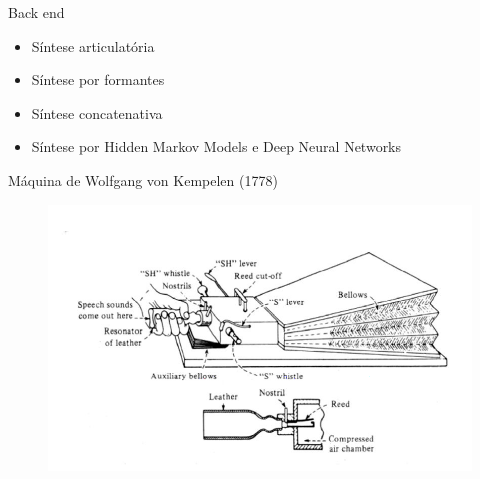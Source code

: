 \documentclass{beamer}
\begin{document}
\begin{frame}{Back end}
\begin{itemize}
  \item Síntese articulatória
  \item Síntese por formantes
  \item Síntese concatenativa
  \item Síntese por Hidden Markov Models e Deep Neural Networks
\end{itemize}
\end{frame}


\begin{frame}{Máquina de Wolfgang von Kempelen (1778)}
    \begin{figure}
      \includegraphics[scale=0.40]{kempelen.png}
    \end{figure}
\end{frame}
\end{document}
